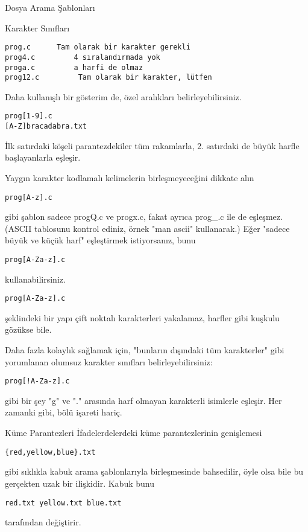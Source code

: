 \documentclass[10pt,a5paper]{book}
\begin{document}
\begin{section}{Dosya Arama Şablonları}
\begin{subsection}{Karakter Sınıfları}
\begin{verbatim}
prog.c 		Tam olarak bir karakter gerekli
prog4.c 		4 sıralandırmada yok
proga.c 		a harfi de olmaz
prog12.c		 Tam olarak bir karakter, lütfen
\end{verbatim}
Daha kullanışlı bir gösterim de, özel aralıkları belirleyebilirsiniz.
\begin{verbatim}
prog[1-9].c
[A-Z]bracadabra.txt
\end{verbatim}
İlk satırdaki köşeli parantezdekiler tüm rakamlarla, 2. satırdaki de büyük harfle başlayanlarla eşleşir.

Yaygın karakter kodlamalı kelimelerin birleşmeyeceğini dikkate alın
\begin{verbatim}
prog[A-z].c
\end{verbatim}
gibi şablon sadece progQ.c ve progx.c, fakat ayrıca prog\_.c ile de eşleşmez.(ASCII tablosunu kontrol ediniz, örnek "man ascii" kullanarak.) Eğer "sadece büyük ve küçük harf" eşleştirmek istiyorsanız, bunu

\begin{verbatim}
prog[A-Za-z].c
\end{verbatim}
kullanabilirsiniz.
\begin{verbatim}
prog[A-Za-z].c
\end{verbatim}
şeklindeki bir yapı çift noktalı karakterleri yakalamaz, harfler gibi kuşkulu gözükse bile.

Daha fazla kolaylık sağlamak için, "bunların dışındaki tüm karakterler" gibi yorumlanan olumsuz karakter sınıfları belirleyebilirsiniz: 
\begin{verbatim}
prog[!A-Za-z].c
\end{verbatim}
gibi bir şey "g" ve "." arasında harf olmayan karakterli isimlerle eşleşir. Her zamanki gibi, bölü işareti hariç.

\end{subsection}
\begin{subsection}{Küme Parantezleri}
İfadelerdelerdeki küme parantezlerinin genişlemesi
\begin{verbatim}
{red,yellow,blue}.txt
\end{verbatim}
gibi sıklıkla kabuk arama şablonlarıyla birleşmesinde bahsedilir, öyle olsa bile bu gerçekten uzak bir ilişkidir. Kabuk bunu
\begin{verbatim}
red.txt yellow.txt blue.txt
\end{verbatim}
tarafından değiştirir.


\end{subsection}
\end{section}
\end{document}
